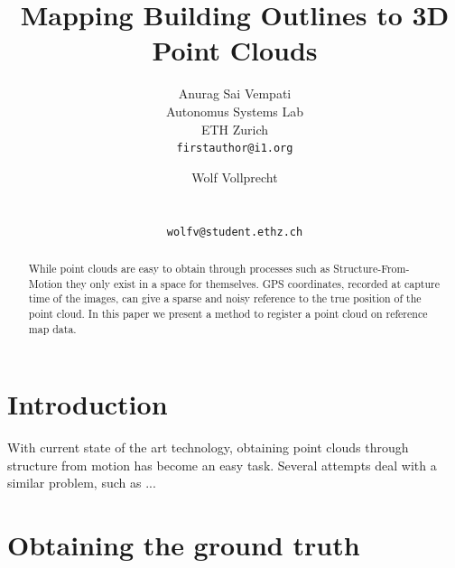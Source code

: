 \documentclass[10pt,twocolumn,letterpaper]{article}
\begin{document}
\title{Mapping Building Outlines to 3D Point Clouds}

\author{Anurag Sai Vempati\\
Autonomus Systems Lab\\ ETH Zurich\\
{\tt\small firstauthor@i1.org}
\and
Wolf Vollprecht\\
\\
\\
{\tt\small wolfv@student.ethz.ch}
}

\maketitle

\begin{abstract}
  While point clouds are easy to obtain through processes such as Structure-From-Motion they only exist in a space for themselves. GPS coordinates, recorded at capture time of the images, can give a sparse and noisy reference to the true position of the point cloud. In this paper we present a method to register a point cloud on reference map data.
\end{abstract}

\section{Introduction}

With current state of  the art technology, obtaining point clouds through structure from motion has become an easy task. 
Several attempts deal with a similar problem, such as ... 

\section{Obtaining the ground truth}
\end{document}
